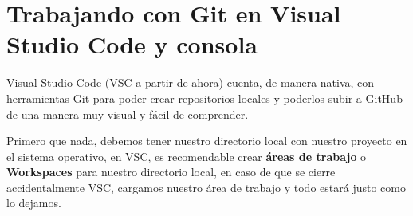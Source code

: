 \section{Trabajando con Git en Visual Studio Code y consola}

Visual Studio Code (VSC a partir de ahora) cuenta, de manera nativa, con herramientas Git para poder crear repositorios locales y poderlos subir a GitHub de una manera muy visual y fácil de comprender.

Primero que nada, debemos tener nuestro directorio local con nuestro proyecto en el sistema operativo, en VSC, es recomendable crear \textbf{áreas de trabajo} o \textbf{Workspaces} para nuestro directorio local, en caso de que se cierre accidentalmente VSC, cargamos nuestro área de trabajo y todo estará justo como lo dejamos.


